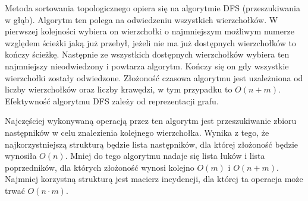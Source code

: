 \documentclass[polish,polish,a4paper]{article}
\begin{document}
\begin{spacing}{1.25}
	\begin{figure}[H]
	
		\centering
	\end{figure}

		
Metoda sortowania topologicznego opiera się na algorytmie DFS (przeszukiwania w głąb). Algorytm ten polega na odwiedzeniu wszystkich wierzchołków. W pierwszej kolejności wybiera on wierzchołki o najmniejszym możliwym numerze względem ścieżki jaką już przebył, jeżeli nie ma już dostępnych wierzchołków to kończy ścieżkę. Następnie ze wszystkich dostępnych wierzchołków wybiera ten najmniejszy nieodwiedzony i powtarza algorytm. Kończy się on gdy wszystkie wierzchołki zostały odwiedzone. Złożoność czasowa algorytmu jest uzależniona od liczby wierzchołków oraz liczby krawędzi, w tym przypadku to $ O(n+m) $. Efektywność algorytmu DFS zależy od reprezentacji grafu. 

Najczęściej wykonywaną operacją przez ten algorytm jest przeszukiwanie zbioru następników w celu znalezienia kolejnego wierzchołka. Wynika z tego, że najkorzystniejszą strukturą będzie lista następników, dla której złożoność będzie wynosiła $ O(n) $. Mniej do tego algorytmu nadaje się lista łuków i lista poprzedników, dla których złożoność wynosi kolejno $ O(m) $ i $ O(n+m) $. Najmniej korzystną strukturą jest macierz incydencji, dla której ta operacja może trwać $ O(n \cdot m) $. 


\end{spacing}
\end{document}
